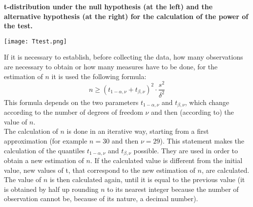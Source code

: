 \begin{frame}
  \vspace*{.25cm}
  \begin{small}
    \textbf{t-distribution under the null hypothesis (at the left) and the alternative hypothesis (at the right) for the calculation of the power of the test.}
  \end{small}
  \begin{center}
    \texttt{[image: Ttest.png]}
  \end{center}
\end{frame}

\begin{frame}
  \begin{small}
    If it is necessary to establish, before collecting the data, how many observations are necessary to obtain or how many measures have to be done, for the estimation of  {\boldmath $ n $} it is used the following formula:
    $$ n\geq(t_{1-\alpha,\nu}+t_{\beta,\nu})^2\cdot \frac{s^2}{\delta^2}$$
    This formula depends on the two parameters $t_{1-\alpha,\nu}$ and $t_{\beta,\nu}$, which change according to the number of degrees of freedom {\boldmath$\nu$} and then (according to) the value of {\boldmath $ n $}.\\
    The calculation of {\boldmath $ n $} is done in an iterative way, starting from a first approximation (for example $ n=30 $ and then $\nu=29$). This statement makes the calculation of the quantiles $ t_{1-\alpha,\nu} $ and $ t_{\beta,\nu} $ possible. They are used in order to obtain a new estimation of {\boldmath $ n $}. If the calculated value is different from the initial value, new values of t, that correspond to the new estimation of {\boldmath $ n $}, are calculated. The value of {\boldmath $ n $} is then calculated again, until it is equal to the previous value (it is obtained by half up rounding {\boldmath $ n $} to its nearest integer because the number of observation cannot be, because of its nature, a decimal number).\\
  \end{small}
\end{frame}


